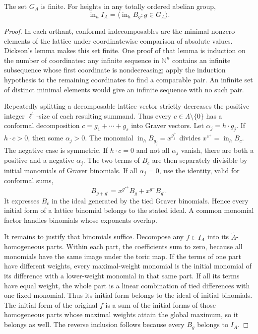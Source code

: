 \documentclass[11pt,a4paper]{article}
\numberwithin{equation}{section}
\theoremstyle{plain}
\newcommand{\Atil}{\widetilde A}
\begin{document}
\begin{lemma}
\label{poly:lem:graver}
The set $G_A$ is finite. For heights in any totally ordered abelian group,
\[
 \operatorname{in}_h I_A
 =\bigl\langle\operatorname{in}_h B_g:g\in G_A\bigr\rangle.
\]
\end{lemma}
\begin{proof}
In each orthant, conformal indecomposables are the minimal nonzero elements
of the lattice under coordinatewise comparison of absolute values.
Dickson's lemma makes this set finite. One proof of that lemma is induction
on the number of coordinates: any infinite sequence in $\mathbb N^n$
contains an infinite subsequence whose first coordinate is nondecreasing;
apply the induction hypothesis to the remaining coordinates to find a
comparable pair. An infinite set of distinct minimal elements would give
an infinite sequence with no such pair.

Repeatedly splitting a decomposable lattice vector strictly decreases the
positive integer $\ell^1$-size of each resulting summand. Thus every
$c\in\Lambda\setminus\{0\}$ has a conformal decomposition
$c=g_1+\cdots+g_s$ into Graver vectors. Let
$\alpha_j=h\cdot g_j$. If $h\cdot c>0$, then some $\alpha_j>0$.
The monomial $\operatorname{in}_h B_{g_j}=x^{g_j^+}$ divides
$x^{c^+}=\operatorname{in}_h B_c$. The negative case is symmetric.
If $h\cdot c=0$ and not all $\alpha_j$ vanish, there are both a
positive and a negative $\alpha_j$. The two terms of $B_c$ are then
separately divisible by initial monomials of Graver binomials.
If all $\alpha_j=0$, use the identity, valid for conformal sums,
\[
 B_{g+g'}=x^{g'^+}B_g+x^{g^-}B_{g'}.
\]
It expresses $B_c$ in the ideal generated by the tied Graver binomials.
Hence every initial form of a lattice binomial belongs to the stated ideal.
A common monomial factor handles binomials whose exponents overlap.

It remains to justify that binomials suffice. Decompose any $f\in I_A$
into its $\Atil$-homogeneous parts. Within each part, the coefficients sum
to zero, because all monomials have the same image under the toric map.
If the terms of one part have different weights, every maximal-weight
monomial is the initial monomial of its difference with a lower-weight
monomial in that same part. If all its terms have equal weight, the whole
part is a linear combination of tied differences with one fixed monomial.
Thus its initial form belongs to the ideal of initial binomials. The
initial form of the original $f$ is a sum of the initial forms of those
homogeneous parts whose maximal weights attain the global maximum, so
it belongs as well. The reverse inclusion follows because every $B_g$
belongs to $I_A$.
\end{proof}
\end{document}
